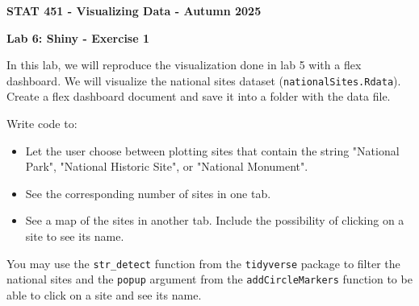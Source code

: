 \documentclass[letterpaper, 12pt]{article}
\begin{document}
\begin{center}
\textbf{\Large{STAT 451 - Visualizing Data - Autumn 2025}}
\end{center}

\vspace{2em}

\textbf{\large{Lab 6: Shiny - Exercise 1}}

\vspace{2em}

In this lab, we will reproduce the visualization done in lab 5 with a flex dashboard. We will visualize the national sites dataset (\verb|nationalSites.Rdata|). Create a flex dashboard document and save it into a folder with the data file.

\vspace{1em}

Write code to:
\begin{itemize}
	\item Let the user choose between plotting sites that contain the string "National Park", "National Historic Site", or "National Monument".
	\item See the corresponding number of sites in one tab.
	\item See a map of the sites in another tab. Include the possibility of clicking on a site to see its name.
\end{itemize}

\vspace{1em}

You may use the \verb|str_detect| function from the \verb|tidyverse| package to filter the national sites and the \verb|popup| argument from the \verb|addCircleMarkers| function to be able to click on a site and see its name.
 
\end{document}
